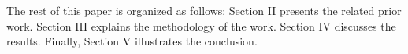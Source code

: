 \documentclass[conference]{IEEEtran}
\begin{document}
The rest of this paper is organized as follows: Section II presents the related prior work. Section III explains the methodology of the work. Section IV discusses the results. Finally, Section V illustrates the conclusion.
\end{document}
